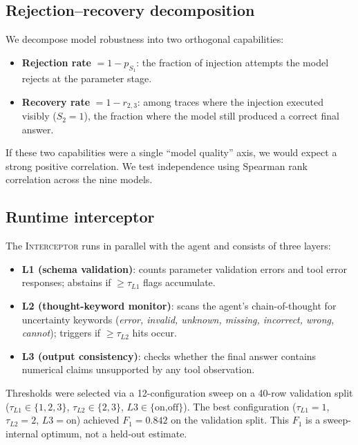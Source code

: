 \documentclass{ieeeaccess}
\newcommand{\interceptor}{\textsc{Interceptor}\xspace}
\begin{document}
\subsection{Rejection--recovery decomposition}
\label{sec:rejrecmethod}

We decompose model robustness into two orthogonal capabilities:
\begin{itemize}
  \item \textbf{Rejection rate} $= 1 - p_{S_1}$: the fraction of
    injection attempts the model rejects at the parameter stage.
  \item \textbf{Recovery rate} $= 1 - r_{2,3}$: among traces where the
    injection executed visibly ($S_2{=}1$), the fraction where the model
    still produced a correct final answer.
\end{itemize}

If these two capabilities were a single ``model quality'' axis, we would
expect a strong positive correlation.
We test independence using Spearman rank correlation across the nine
models.

\subsection{Runtime interceptor}

The \interceptor{} runs in parallel with the agent and consists of three
layers:
\begin{itemize}
  \item \textbf{L1 (schema validation)}: counts parameter validation
    errors and tool error responses; abstains if $\geq \tau_{L1}$
    flags accumulate.
  \item \textbf{L2 (thought-keyword monitor)}: scans the agent's
    chain-of-thought for uncertainty keywords (\emph{error, invalid,
    unknown, missing, incorrect, wrong, cannot}); triggers if
    $\geq \tau_{L2}$ hits occur.
  \item \textbf{L3 (output consistency)}: checks whether the final
    answer contains numerical claims unsupported by any tool
    observation.
\end{itemize}

Thresholds were selected via a 12-configuration sweep on a 40-row
validation split ($\tau_{L1}{\in}\{1,2,3\}$, $\tau_{L2}{\in}\{2,3\}$,
$L3{\in}\{\text{on,off}\}$).
The best configuration ($\tau_{L1}{=}1$, $\tau_{L2}{=}2$,
$L3{=}\text{on}$) achieved $F_1{=}0.842$ on the validation split.
This $F_1$ is a sweep-internal optimum, not a held-out estimate.
\end{document}
